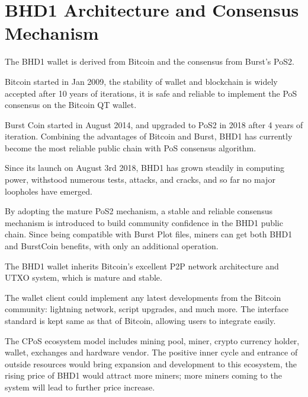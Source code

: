\section{BHD1 Architecture and Consensus Mechanism}
\begin{flushleft}
    The BHD1 wallet is derived from Bitcoin and the consensus from Burst's PoS2.
\end{flushleft}
\begin{flushleft}
    Bitcoin started in Jan 2009, the stability of wallet and blockchain is widely accepted after 10 years of iterations, it is safe and reliable to implement the PoS consensus on the Bitcoin QT wallet.
\end{flushleft}
\begin{flushleft}
    Burst Coin started in August 2014, and upgraded to PoS2 in 2018 after 4 years of iteration. Combining the advantages of Bitcoin and Burst, BHD1 has currently become the most reliable public chain with PoS consensus algorithm.
\end{flushleft}
\begin{flushleft}
    Since its launch on August 3rd 2018, BHD1 has grown steadily in computing power, withstood numerous tests, attacks, and cracks, and so far no major loopholes have emerged.
\end{flushleft}
\begin{flushleft}
    By adopting the mature PoS2 mechanism, a stable and reliable consensus mechanism is introduced to build community confidence in the BHD1 public chain. Since being compatible with Burst Plot files, miners can get both BHD1 and BurstCoin benefits, with only an additional operation.
\end{flushleft}
\begin{flushleft}
    The BHD1 wallet inherits Bitcoin's excellent P2P network architecture and UTXO system, which is mature and stable.
\end{flushleft}
\begin{flushleft}
    The wallet client could implement any latest developments from the Bitcoin community: lightning network, script upgrades, and much more. The interface standard is kept same as that of Bitcoin, allowing users to integrate easily.
\end{flushleft}
\begin{flushleft}
    The CPoS ecosystem model includes mining pool, miner, crypto currency holder, wallet, exchanges and hardware vendor. The positive inner cycle and entrance of outside resources would bring expansion and development to this ecosystem, the rising price of BHD1 would attract more miners; more miners coming to the system will lead to further price increase.
\end{flushleft}
